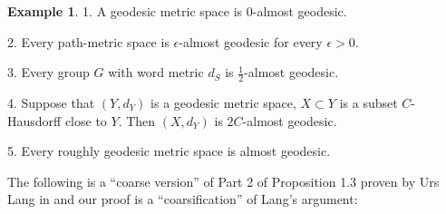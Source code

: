 \documentclass[12pt]{amsbook}%
\theoremstyle{definition}
\newtheorem{example}[thm]{Example}
\theoremstyle{remark}
\numberwithin{section}{chapter}
\numberwithin{subsection}{section}
\numberwithin{figure}{chapter}
\def\eps{\epsilon}
\begin{document}
\begin{example}
1. A geodesic metric space is $0$-almost geodesic. 

2. Every path-metric space is $\eps$-almost geodesic for every $\eps>0$. 

3. Every group $G$ with word metric $d_S$ is $\frac{1}{2}$-almost geodesic. 

4. Suppose that $(Y,d_Y)$ is a geodesic metric space, $X\subset Y$ is a subset $C$-Hausdorff close to $Y$. Then $(X,d_Y)$ is $2C$-almost geodesic. 

5. Every roughly geodesic metric space  is almost geodesic. 
\end{example} 

The following is a ``coarse version'' of Part 2 of Proposition 1.3 proven by Urs Lang in \cite{Lang} and our proof is a ``coarsification'' of Lang's argument: 
\end{document}
